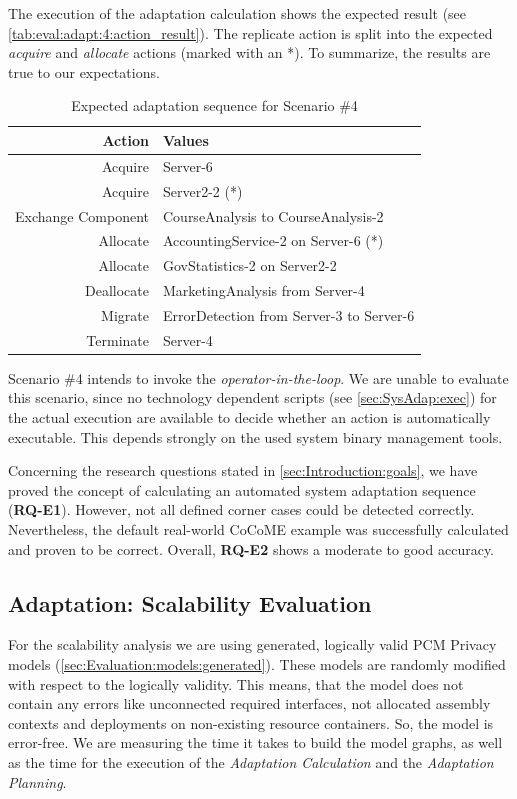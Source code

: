 The execution of the adaptation calculation shows the expected result (see \autoref{tab:eval:adapt:4:action_result}). The replicate action is split into the expected \textit{acquire} and \textit{allocate} actions (marked with an *). To summarize, the results are true to our expectations.

\begin{table}[h]
	\centering
	\begin{tabular}{r | l }
		\hline
		\textbf{Action} & \textbf{Values}\\
		\hline
		Acquire & Server-6\\
		Acquire & Server2-2 (*)\\
		Exchange Component & CourseAnalysis to CourseAnalysis-2\\
		Allocate & AccountingService-2 on Server-6 (*)\\
		Allocate & GovStatistics-2 on Server2-2\\
		Deallocate & MarketingAnalysis from Server-4\\
		Migrate & ErrorDetection from Server-3 to Server-6\\
		Terminate & Server-4\\
		\hline
	\end{tabular}
	\caption{Expected adaptation sequence for Scenario \#4}
	\label{tab:eval:adapt:4:action_result}
\end{table}

Scenario \#4 intends to invoke the \textit{operator-in-the-loop}. We are unable to evaluate this scenario, since no technology dependent scripts (see \autoref{sec:SysAdap:exec}) for the actual execution are available to decide whether an action is automatically executable. This depends strongly on the used system binary management tools.

Concerning the research questions stated in \autoref{sec:Introduction:goals}, we have proved the concept of calculating an automated system adaptation sequence (\textbf{RQ-E1}). However, not all defined corner cases could be detected correctly. Nevertheless, the default real-world CoCoME example was successfully calculated and proven to be correct. Overall, \textbf{RQ-E2} shows a moderate to good accuracy.


\subsection{Adaptation: Scalability Evaluation}

For the scalability analysis we are using generated, logically valid PCM Privacy models (\autoref{sec:Evaluation:models:generated}). These models are randomly modified with respect to the logically validity. This means, that the model does not contain any errors like unconnected required interfaces, not allocated assembly contexts and deployments on non-existing resource containers. So, the model is error-free. We are measuring the time it takes to build the model graphs, as well as the time for the execution of the \textit{Adaptation Calculation} and the \textit{Adaptation Planning}.

